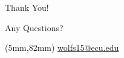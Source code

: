 \documentclass[xcolor=dvipsnames,table]{beamer}
\begin{document}
\begin{frame}{}
  \vfill \centerline{\Huge Thank You!}  \vfill \centerline{\Large Any Questions?}
  \vfill
  \begin{textblock*}{0.5\textwidth}(5mm,82mm) \textblockcolor{} {\scriptsize
      \url{wolfs15@ecu.edu} }
  \end{textblock*}
\end{frame}




\end{document}
